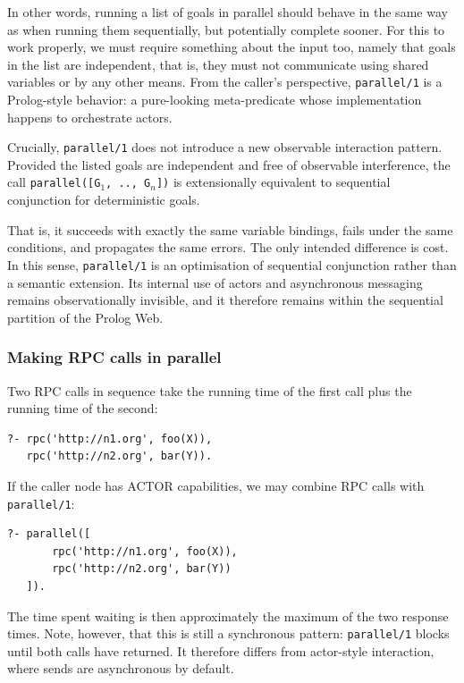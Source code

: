 \noindent In other words, running a list of goals in parallel should behave in the same way as when running them sequentially, but potentially complete sooner. For this to work properly, we must require something about the input too, namely that goals in the list are independent, that is, they must not communicate using shared variables or by any other means. From the caller's perspective,  \texttt{parallel/1} is a Prolog-style behavior: a pure-looking meta-predicate whose implementation happens to orchestrate actors.


Crucially, \texttt{parallel/1} does not introduce a new observable interaction pattern. Provided the listed goals are independent and free of observable interference, the call \texttt{parallel([G$_1$,\,..,\,G$_n$])} is extensionally equivalent to sequential conjunction for deterministic goals.

That is, it succeeds with exactly the same variable bindings, fails under the same conditions, and propagates the same errors. The only intended difference is cost. In this sense, \texttt{parallel/1} is an optimisation of sequential conjunction rather than a semantic extension. Its internal use of actors and asynchronous messaging remains observationally invisible, and it therefore remains within the sequential partition of the Prolog Web.



\subsubsection{Making RPC calls in parallel}\label{sec:parallel-rpc}

Two RPC calls in sequence take the running time of the first call plus the running time of the second:

\begin{verbatim}
?- rpc('http://n1.org', foo(X)),
   rpc('http://n2.org', bar(Y)).
\end{verbatim}

\noindent If the caller node has ACTOR capabilities, we may combine RPC calls with \texttt{parallel/1}:

\begin{verbatim}
?- parallel([
       rpc('http://n1.org', foo(X)),
       rpc('http://n2.org', bar(Y))
   ]).
\end{verbatim}

\noindent The time spent waiting is then approximately the maximum of the two response times. Note, however, that this is still a synchronous pattern: \texttt{parallel/1} blocks until both calls have returned. It therefore differs from actor-style interaction, where sends are asynchronous by default. 

